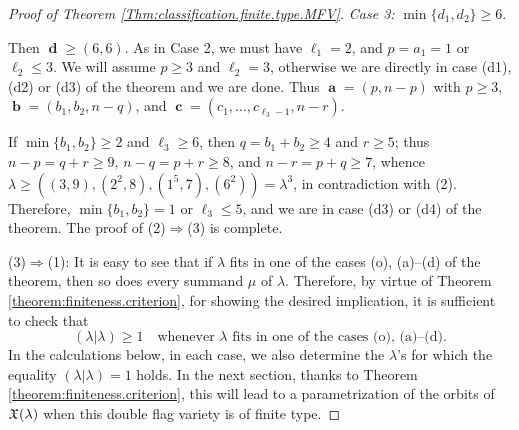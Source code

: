 \documentclass[12pt,reqno]{amsart}
\begin{document}
\begin{proof}[Proof  of Theorem \ref{Thm:classification.finite.type.MFV}]
\medskip
\noindent
{\it Case 3:} $\min\{d_1,d_2\}\geq 6$.

Then $\mbfd\geq (6,6)$. As in Case 2, we must have $\ell_1=2$, and $p=a_1=1$ or $\ell_2\leq 3$.
We will assume $p\geq 3$ and $\ell_2=3$, otherwise we are directly in case (d1), (d2) or (d3) of the theorem and we are done. Thus $\mbfa=(p,n-p)$ with $p\geq 3$, $\mbfb=(b_1,b_2,n-q)$,
and $\mbfc=(c_1,\ldots,c_{\ell_3-1},n-r)$.

If $\min\{b_1,b_2\}\geq 2$ and $\ell_3\geq 6$,
then $q=b_1+b_2\geq 4$ and $r\geq 5$;
thus $n-p=q+r\geq 9$, $n-q=p+r\geq 8$, and $n-r=p+q\geq 7$,
whence $\lambda\geq ((3,9),(2^2,8),(1^5,7),(6^2))=\lambda^3$, in contradiction with (2).
Therefore, $\min\{b_1,b_2\}=1$ or $\ell_3\leq 5$, and we are in case (d3) or (d4) of the theorem.
The proof of (2)$\Rightarrow$(3) is complete.


\bigskip

(3)$\Rightarrow$(1): It is easy to see that if $\lambda$ fits in one of the cases (o), (a)--(d) of the theorem, then so does every summand $\mu$ of $\lambda$. Therefore, by virtue of Theorem \ref{theorem:finiteness.criterion}, for showing the desired implication, it is sufficient to check that
$$
(\lambda|\lambda)\geq 1\quad\mbox{whenever $\lambda$ fits in one of the cases (o), (a)--(d)}.
$$
In the calculations below, in each case, we also determine the $\lambda$'s for which the equality $(\lambda|\lambda)=1$ holds.
In the next section, thanks to Theorem \ref{theorem:finiteness.criterion}, this will lead to a parametrization of the orbits of $\mathfrak{X}(\lambda)$ when this double flag variety is of finite type.


\end{proof}
\end{document}
